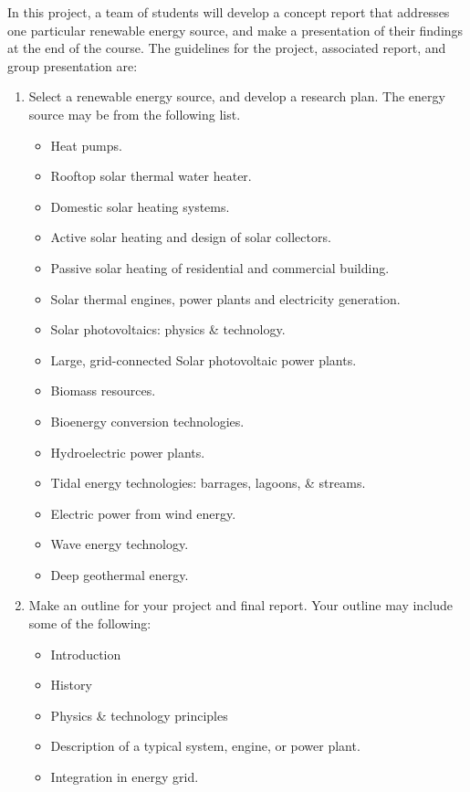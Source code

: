 \documentclass[11pt]{article}
\begin{document}
In this project, a team of students will develop a concept report that addresses one particular renewable energy source, and make a presentation of their findings at the end of the course.  The guidelines for the project, associated report, and group presentation are:
\begin{enumerate}
    \item Select a renewable energy source, and develop a research plan.  The energy source may be from the following list.
    \begin{itemize}
        \item Heat pumps.
        \item Rooftop solar thermal water heater.
        \item Domestic solar heating systems.
        \item Active solar heating and design of solar collectors.
        \item Passive solar heating of residential and commercial building. 
        \item Solar thermal engines, power plants and electricity generation.
        \item Solar photovoltaics: physics \& technology.
        \item Large, grid-connected Solar photovoltaic power plants.
        \item Biomass resources.
        \item Bioenergy conversion technologies.
        \item Hydroelectric power plants.
        \item Tidal energy technologies: barrages, lagoons, \& streams.
        \item Electric power from wind energy.
        \item Wave energy technology.
        \item Deep geothermal energy.
    \end{itemize}
    \item Make an outline for your project and final report.  Your outline may include some of the following:
    \begin{itemize}
        \item Introduction
        \item History
        \item Physics \& technology principles
        \item Description of a typical system, engine, or power plant.
        \item Integration in energy grid.

\end{itemize}
\end{enumerate}
\end{document}
